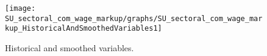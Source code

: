  
\begin{figure}[H]
\centering 
\texttt{[image: SU\_sectoral\_com\_wage\_markup/graphs/SU\_sectoral\_com\_wage\_markup\_HistoricalAndSmoothedVariables1]}
\caption{Historical and smoothed variables.}\label{Fig:HistoricalAndSmoothedVariables:1}
\end{figure}


